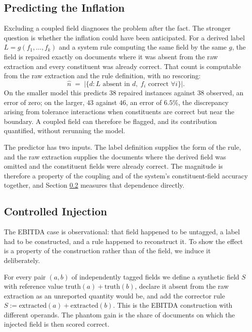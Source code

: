 \documentclass[11pt]{article}
\begin{document}
\subsection{Predicting the Inflation}
\label{sec:predict}

Excluding a coupled field diagnoses the problem after the fact. The stronger question
is whether the inflation could have been anticipated. For a derived label
$L = g(f_1,\dots,f_k)$ and a system rule computing the same field by the same $g$, the
field is repaired exactly on documents where it was absent from the raw extraction and
every constituent was already correct. That count is computable from the raw extraction
and the rule definition, with no rescoring:
\[
\widehat{n} \;=\; \bigl|\{d : L \text{ absent in } d,\; f_i \text{ correct } \forall i\}\bigl|.
\]
On the smaller model this predicts $38$ repaired instances against $38$ observed, an
error of zero; on the larger, $43$ against $46$, an error of $6.5\%$, the discrepancy
arising from tolerance interactions when constituents are correct but near the
boundary.
A coupled field can therefore be flagged, and its contribution quantified, without
rerunning the model.

The predictor has two inputs. The label definition supplies the form of the rule, and the
raw extraction supplies the documents where the derived field was omitted and the
constituent fields were already correct. The magnitude is therefore a property of the
coupling and of the system's constituent-field accuracy together, and Section
\ref{sec:inject} measures that dependence directly.

\subsection{Controlled Injection}
\label{sec:inject}

The EBITDA case is observational: that field happened to be untagged, a label had to be
constructed, and a rule happened to reconstruct it. To show the effect is a property of
the construction rather than of the field, we induce it deliberately.

For every pair $(a,b)$ of independently tagged fields we define a synthetic field $S$
with reference value $\mathrm{truth}(a) + \mathrm{truth}(b)$, declare it absent from
the raw extraction as an unreported quantity would be, and add the corrector rule
$S := \mathrm{extracted}(a) + \mathrm{extracted}(b)$. This is the EBITDA construction
with different operands. The phantom gain is the share of documents on which the
injected field is then scored correct.
\end{document}
